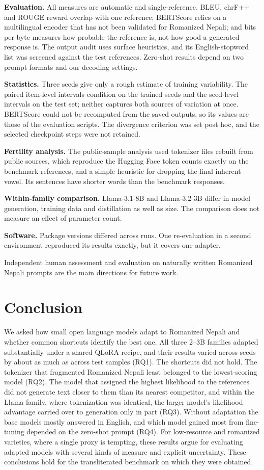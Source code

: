 \documentclass{article}
\begin{document}
\textbf{Evaluation.} All measures are automatic and single-reference. BLEU, chrF++ and ROUGE reward overlap with one reference; BERTScore relies on a multilingual encoder that has not been validated for Romanized Nepali; and bits per byte measures how probable the reference is, not how good a generated response is. The output audit uses surface heuristics, and its English-stopword list was screened against the test references. Zero-shot results depend on two prompt formats and our decoding settings.

\textbf{Statistics.} Three seeds give only a rough estimate of training variability. The paired item-level intervals condition on the trained seeds and the seed-level intervals on the test set; neither captures both sources of variation at once. BERTScore could not be recomputed from the saved outputs, so its values are those of the evaluation scripts. The divergence criterion was set post hoc, and the selected checkpoint steps were not retained.

\textbf{Fertility analysis.} The public-sample analysis used tokenizer files rebuilt from public sources, which reproduce the Hugging Face token counts exactly on the benchmark references, and a simple heuristic for dropping the final inherent vowel. Its sentences have shorter words than the benchmark responses.

\textbf{Within-family comparison.} Llama-3.1-8B and Llama-3.2-3B differ in model generation, training data and distillation as well as size. The comparison does not measure an effect of parameter count.

\textbf{Software.} Package versions differed across runs. One re-evaluation in a second environment reproduced its results exactly, but it covers one adapter.

Independent human assessment and evaluation on naturally written Romanized Nepali prompts are the main directions for future work.

\section{Conclusion}\label{sec:conclusion}

We asked how small open language models adapt to Romanized Nepali and whether common shortcuts identify the best one. All three 2–3B families adapted substantially under a shared QLoRA recipe, and their results varied across seeds by about as much as across test samples (RQ1). The shortcuts did not hold. The tokenizer that fragmented Romanized Nepali least belonged to the lowest-scoring model (RQ2). The model that assigned the highest likelihood to the references did not generate text closer to them than its nearest competitor, and within the Llama family, where tokenization was identical, the larger model's likelihood advantage carried over to generation only in part (RQ3). Without adaptation the base models mostly answered in English, and which model gained most from fine-tuning depended on the zero-shot prompt (RQ4). For low-resource and romanized varieties, where a single proxy is tempting, these results argue for evaluating adapted models with several kinds of measure and explicit uncertainty. These conclusions hold for the transliterated benchmark on which they were obtained.
\end{document}
